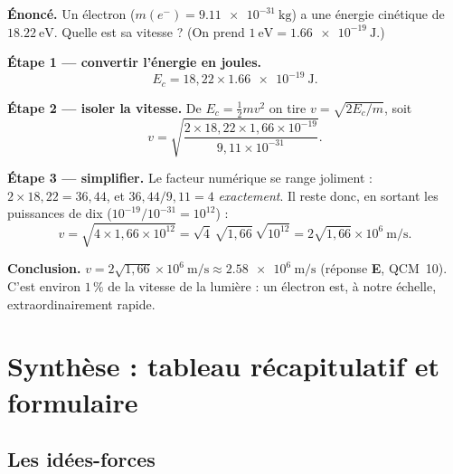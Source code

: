 \documentclass[11pt,a4paper]{article}
\newcommand{\ee}{e^{-}}      %
\begin{document}
\begin{exemple}
\textbf{Énoncé.} Un électron ($m(\ee) = \SI{9,11e-31}{\kilo\gram}$) a une énergie cinétique de
$\SI{18,22}{\electronvolt}$. Quelle est sa vitesse ? (On prend $\SI{1}{\electronvolt} = \SI{1,66e-19}{\joule}$.)

\smallskip
\textbf{Étape 1 — convertir l'énergie en joules.}
\[ E_c = 18{,}22 \times \SI{1,66e-19}{\joule}. \]

\textbf{Étape 2 — isoler la vitesse.} De $E_c = \tfrac12 m v^2$ on tire $v = \sqrt{2E_c/m}$, soit
\[ v = \sqrt{\frac{2 \times 18{,}22 \times 1{,}66\times 10^{-19}}{9{,}11\times 10^{-31}}}. \]

\textbf{Étape 3 — simplifier.} Le facteur numérique se range joliment : $2 \times 18{,}22 = 36{,}44$,
et $36{,}44 / 9{,}11 = 4$ \emph{exactement}. Il reste donc, en sortant les puissances de dix
($10^{-19}/10^{-31} = 10^{12}$) :
\[ v = \sqrt{4 \times 1{,}66 \times 10^{12}} = \sqrt{4}\,\sqrt{1{,}66}\,\sqrt{10^{12}}
     = 2\sqrt{1{,}66}\times 10^{6}\ \si{\metre\per\second}. \]

\textbf{Conclusion.} $v = 2\sqrt{1{,}66}\times 10^{6}\ \si{\metre\per\second} \approx
\SI{2,58e6}{\metre\per\second}$ (réponse \textbf{E}, QCM~10). C'est environ $1\,\%$ de la vitesse de la
lumière : un électron est, à notre échelle, extraordinairement rapide.
\end{exemple}

\section{Synthèse : tableau récapitulatif et formulaire}
\subsection{Les idées-forces}
\end{document}
